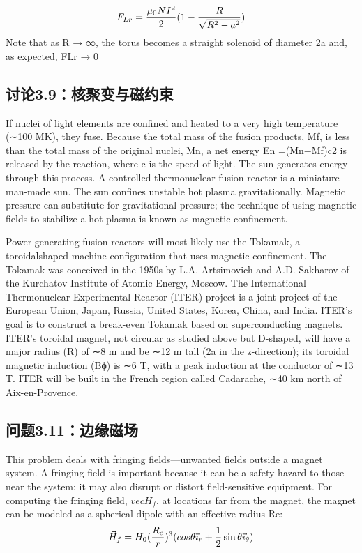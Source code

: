 $$
F_{Lr}=\frac{\mu_{0}NI^{2}}{2}(1-\frac{R}{\sqrt{R^{2}-a^{2}}})\\%
$$
Note that as R → ∞, the torus becomes a straight solenoid of diameter 2a and,
as expected, FLr → 0
\newpage


\subsection{讨论3.9：核聚变与磁约束}
If nuclei of light elements are confined and heated to a very high temperature
(∼100 MK), they fuse. Because the total mass of the fusion products, Mf, is less
than the total mass of the original nuclei, Mn, a net energy En =(Mn−Mf)c2 is
released by the reaction, where c is the speed of light. The sun generates energy
through this process. A controlled thermonuclear fusion reactor is a miniature
man-made sun. The sun confines unstable hot plasma gravitationally. Magnetic
pressure can substitute for gravitational pressure; the technique of using magnetic
fields to stabilize a hot plasma is known as magnetic confinement.


Power-generating fusion reactors will most likely use the Tokamak, a toroidalshaped machine configuration that uses magnetic confinement. The Tokamak was
conceived in the 1950s by L.A. Artsimovich and A.D. Sakharov of the Kurchatov
Institute of Atomic Energy, Moscow. The International Thermonuclear Experimental Reactor (ITER) project is a joint project of the European Union, Japan,
Russia, United States, Korea, China, and India. ITER’s goal is to construct a
break-even Tokamak based on superconducting magnets. ITER’s toroidal magnet, not circular as studied above but D-shaped, will have a major radius (R) of
∼8 m and be ∼12 m tall (2a in the z-direction); its toroidal magnetic induction
(Bϕ) is ∼6 T, with a peak induction at the conductor of ∼13 T. ITER will be built
in the French region called Cadarache, ∼40 km north of Aix-en-Provence.

\newpage
\subsection{问题3.11：边缘磁场}
This problem deals with fringing fields—unwanted fields outside a magnet system.
A fringing field is important because it can be a safety hazard to those near the
system; it may also disrupt or distort field-sensitive equipment. For computing the
fringing field, $vec{H_f}$, at locations far from the magnet, the magnet can be modeled
as a spherical dipole with an effective radius Re:
$$
\vec{H}_{f}=H_{0}(\frac{R_{e}}{r})^{3}(cos\theta\vec{\imath}_{r}+\frac{1}{2}\sin\theta\vec{\imath}_{\theta})\\%
$$

